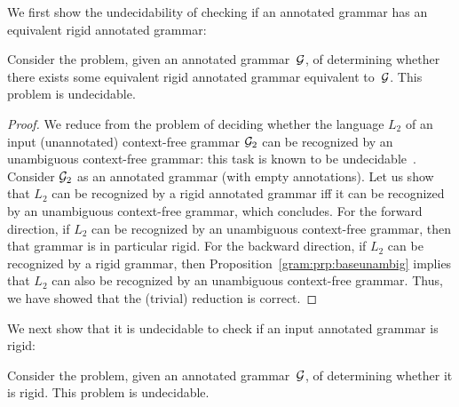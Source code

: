 We first show the undecidability of checking if an annotated grammar has an
equivalent rigid annotated grammar:

\begin{claim}
  \label{gram:prp:unambundec}
  Consider the problem, given an annotated grammar~$\mathcal{G}$, of determining whether
  there exists some equivalent rigid annotated grammar equivalent to~$\mathcal{G}$.
  This problem is undecidable.
\end{claim}

\begin{proof}
  We reduce from the problem of deciding whether the language $L_2$ of an input
  (unannotated) context-free grammar $\mathcal{G}_2$ can be recognized by an unambiguous
  context-free grammar: this task is known to be
  undecidable~\cite{ginsburg1966ambiguity}. Consider $\mathcal{G}_2$ as an annotated
  grammar (with empty annotations). Let us show that $L_2$ can be recognized by
  a rigid annotated grammar iff it can be recognized by an
  unambiguous context-free grammar, which concludes. For the forward direction,
  if $L_2$ can be recognized
  by an unambiguous context-free grammar, then that grammar is in particular
  rigid. 
  For the backward direction, if $L_2$ can be recognized by a rigid
  grammar, then
  Proposition~\ref{gram:prp:baseunambig} implies that $L_2$ can also be recognized by
  an unambiguous context-free grammar.
  Thus, we have showed that the (trivial) reduction is correct.
\end{proof}

We next show that it is undecidable to check if an input annotated grammar is
rigid:

\begin{claim}
  \label{gram:prp:unambundecb}
  Consider the problem, given an annotated grammar~$\mathcal{G}$, of determining whether
  it is rigid. This problem is undecidable.
\end{claim}


